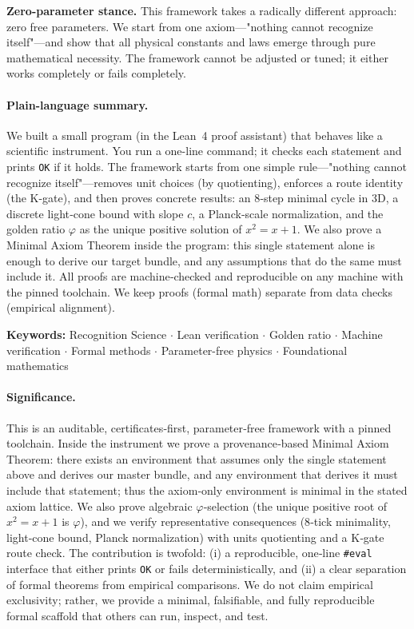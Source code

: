 \documentclass[11pt,a4paper,twoside]{article}
\numberwithin{equation}{section}
\theoremstyle{customthm}
\theoremstyle{customdef}
\theoremstyle{customrem}
\begin{document}
\noindent\textbf{Zero-parameter stance.} This framework takes a radically different approach: zero free parameters. We start from one axiom—"nothing cannot recognize itself"—and show that all physical constants and laws emerge through pure mathematical necessity. The framework cannot be adjusted or tuned; it either works completely or fails completely.

\paragraph{Plain-language summary.} We built a small program (in the Lean~4 proof assistant) that behaves like a scientific instrument. You run a one-line command; it checks each statement and prints \texttt{OK} if it holds. The framework starts from one simple rule—"nothing cannot recognize itself"—removes unit choices (by quotienting), enforces a route identity (the K-gate), and then proves concrete results: an 8‑step minimal cycle in 3D, a discrete light‑cone bound with slope $c$, a Planck‑scale normalization, and the golden ratio $\varphi$ as the unique positive solution of $x^2 = x + 1$. We also prove a Minimal Axiom Theorem inside the program: this single statement alone is enough to derive our target bundle, and any assumptions that do the same must include it. All proofs are machine‑checked and reproducible on any machine with the pinned toolchain. We keep proofs (formal math) separate from data checks (empirical alignment).

\vspace{1em}
\noindent\textbf{Keywords:} Recognition Science $\cdot$ Lean verification $\cdot$ Golden ratio $\cdot$ Machine verification $\cdot$ Formal methods $\cdot$ Parameter-free physics $\cdot$ Foundational mathematics


\paragraph{Significance.} This is an auditable, certificates‑first, parameter‑free framework with a pinned toolchain. Inside the instrument we prove a provenance‑based Minimal Axiom Theorem: there exists an environment that assumes only the single statement above and derives our master bundle, and any environment that derives it must include that statement; thus the axiom‑only environment is minimal in the stated axiom lattice. We also prove algebraic $\varphi$‑selection (the unique positive root of $x^2 = x + 1$ is $\varphi$), and we verify representative consequences (8‑tick minimality, light‑cone bound, Planck normalization) with units quotienting and a K‑gate route check. The contribution is twofold: (i) a reproducible, one‑line \texttt{\#eval} interface that either prints \texttt{OK} or fails deterministically, and (ii) a clear separation of formal theorems from empirical comparisons. We do not claim empirical exclusivity; rather, we provide a minimal, falsifiable, and fully reproducible formal scaffold that others can run, inspect, and test.
\end{document}
